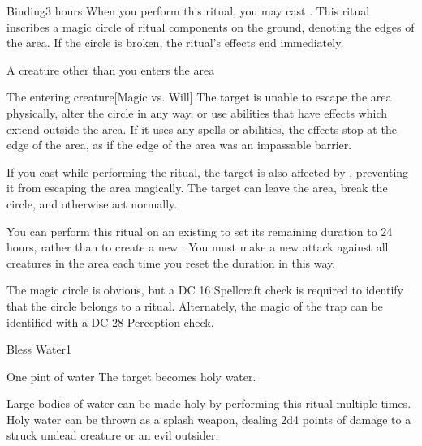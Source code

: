 \begin{spellsection}{Binding}{3}
 hours
\spellspecial When you perform this ritual, you may cast .
\spellline
\spelleffect This ritual inscribes a magic circle of ritual components on the ground, denoting the edges of the area. If the circle is broken, the ritual's effects end immediately.
\begin{spelltrigger}{A creature other than you enters the area}
    \begin{spelltarget}{The entering creature}[Magic vs. Will]
        \spellsuccess The target is unable to escape the area physically, alter the circle in any way, or use abilities that have effects which extend outside the area. If it uses any spells or abilities, the effects stop at the edge of the area, as if the edge of the area was an impassable barrier.

        If you cast  while performing the ritual, the target is also affected by , preventing it from escaping the area magically.
        \spellfailure The target can leave the area, break the circle, and otherwise act normally.
    \end{spelltarget}
\end{spelltrigger}

\spellnotes You can perform this ritual on an existing  to set its remaining duration to 24 hours, rather than to create a new . You must make a new attack against all creatures in the area each time you reset the duration in this way.

The magic circle is obvious, but a DC 16 Spellcraft check is required to identify that the circle belongs to a  ritual. Alternately, the magic of the trap can be identified with a DC 28 Perception check.
\end{spellsection}

\begin{spellsection}{Bless Water}{1}
\begin{spelltarget}{One pint of water}
    \spelleffect The target becomes holy water.
\end{spelltarget}
\spellnotes Large bodies of water can be made holy by performing this ritual multiple times. Holy water can be thrown as a splash weapon, dealing 2d4 points of damage to a struck undead creature or an evil outsider.
\end{spellsection}

